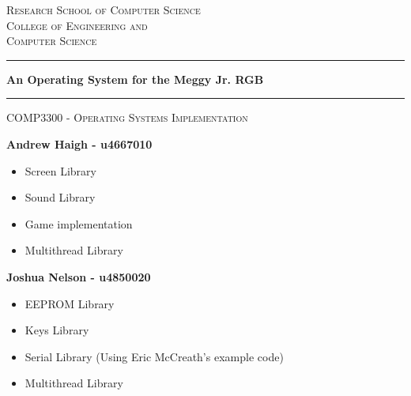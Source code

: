 \documentclass[pdftex,twoside,a4paper]{article}
\begin{document}
\begin{titlepage}
 
\begin{center}

\textsc{\Large Research School of Computer Science}\\[0.5cm]
\textsc{\Large College of Engineering and}\\[0.2cm]
\textsc{\Large Computer Science}\\[0.5cm]


 
\vspace{1.4cm}

\hrule

\vspace{1.4cm}

{ \huge \bfseries An Operating System for the Meggy Jr. RGB} \\
\vspace{1.4cm}
\hrule
\vspace{1.0cm}

\textsc{\large COMP3300 - Operating Systems Implementation}\\

\vspace{1.0cm}

\vspace{1.0cm}
{ \Large \bfseries Andrew Haigh - u4667010} \\
\begin{itemize}
\item Screen Library
\item Sound Library
\item Game implementation
\item Multithread Library
\end{itemize}
\vspace{1.0cm}
{ \Large \bfseries Joshua Nelson - u4850020} \\
\begin{itemize}
 \item EEPROM Library
 \item Keys Library
 \item Serial Library (Using Eric McCreath's example code)
 \item Multithread Library
\end{itemize}
\vspace{1.0cm}
\vfill
\begin{abstract}
A rudimentary operating system for the Meggy Jr. RGB, a handheld device based on the Atmel AVR architecture. A library useful to game developers was created, including functions for interacting with the screen, sound, keys, memory, I/O, and multithreading.
\end{abstract}
 
\end{center}
 
\end{titlepage}
\end{document}
